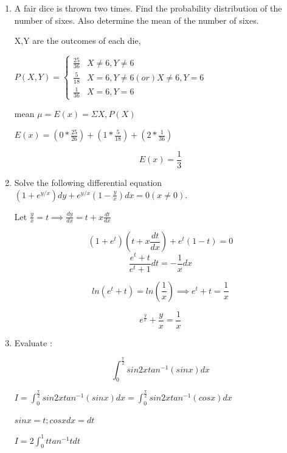 \begin{enumerate}[label=\thesubsection.\arabic*, ref=\thesubsection.\theenumi]
\solution

$\frac{x-5}{3}=y=2-z=k \implies x=3k+5 ,y=k,z=2-k$

substituting them in the plane equation gives, \newline $3k+5-5k-2(2-k)-1 =0 \implies 0=0 $, so the line lies in the plane 

\item

A fair dice is thrown two times. Find the probability distribution of the number of sixes. Also determine the mean of the number of sixes.

\solution

X,Y are the outcomes of each die,

$P(X,Y)=\begin{cases}
    \frac{25}{36}& X\neq6,Y\neq6 \\ \frac{5}{18}&X=6,Y\neq6 (or )X \neq 6 ,Y=6 \\ \frac{1}{36} & X=6 ,Y=6\end{cases}  $
    
mean $\mu= E(x) =\Sigma X,P(X)$

$E(x)= (0* \frac{25}{26})+(1*\frac{5}{18})+(2*\frac{1}{36})$

$$E(x)=\frac{1}{3}$$

\item 

Solve the following differential equation \newline $(1+e^{y/x})dy+e^{y/x}(1-\frac{y}{x})dx=0(x\ne0).$

\solution

Let $\frac{y}{x} =t \implies \frac{dy}{dx} =t + x\frac{dt}{dx} $

$$(1+e^t)(t+x\frac{dt}{dx})+ e^t(1-t) =0$$  $$\frac{e^t +t}{e^t+1}dt=-\frac{1}{x}dx$$

$$ln(e^t + t)=ln(\frac{1}{x}) \implies e^t + t= \frac{1}{x} $$

$$e^{\frac{y}{x}} + \frac{y}{x} = \frac{1}{x}$$

\item 

Evaluate : 

$$ \int_0^\frac{\pi}{2}sin2xtan^{-1}(sinx)dx$$

\solution

$I=\int_0^\frac{\pi}{2} sin2xtan^{-1}(sinx)dx=\int_0^\frac{\pi}{2}sin2xtan^{-1}(cosx)dx$

$sinx=t; cosxdx=dt$


$I=2\int_0^1ttan^{-1}tdt$  


\end{enumerate}
